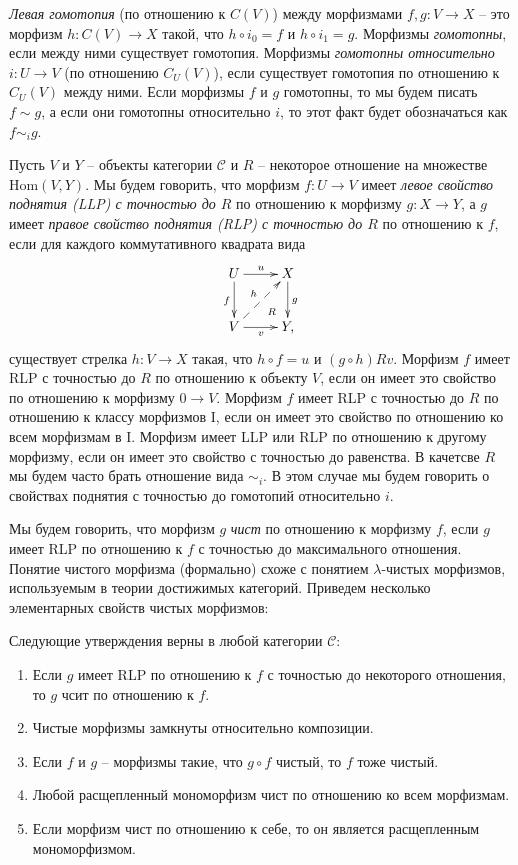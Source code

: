\documentclass[reqno]{amsart}
\theoremstyle{definition}
\theoremstyle{remark}
\newcommand{\cat}[1]{\mathcal{#1}}
\renewcommand{\C}{\cat{C}}
\newcommand{\fs}[1]{\mathrm{#1}}
\newcommand{\Hom}{\fs{Hom}}
\newcommand{\cyli}{i}
\newcommand{\I}{\mathrm{I}}
\begin{document}
\emph{Левая гомотопия} (по отношению к $C(V)$) между морфизмами $f,g : V \to X$ -- это морфизм $h : C(V) \to X$ такой, что $h \circ \cyli_0 = f$ и $h \circ \cyli_1 = g$.
Морфизмы \emph{гомотопны}, если между ними существует гомотопия.
Морфизмы \emph{гомотопны относительно $i : U \to V$} (по отношению $C_U(V)$), если существует гомотопия по отношению к $C_U(V)$ между ними.
Если морфизмы $f$ и $g$ гомотопны, то мы будем писать $f \sim g$, а если они гомотопны относительно $i$, то этот факт будет обозначаться как $f \sim_i g$.

Пусть $V$ и $Y$ -- объекты категории $\C$ и $R$ -- некоторое отношение на множестве $\Hom(V,Y)$.
Мы будем говорить, что морфизм $f : U \to V$ имеет \emph{левое свойство поднятия (LLP) с точностью до $R$} по отношению к морфизму $g : X \to Y$,
а $g$ имеет \emph{правое свойство поднятия (RLP) с точностью до $R$} по отношению к $f$, если для каждого коммутативного квадрата вида
\[ \xymatrix{ U \ar[r]^u \ar@{}[dr]|(.7){R} \ar[d]_f & X \ar[d]^g \\
              V \ar[r]_v \ar@{-->}[ur]^h             & Y,
            } \]
существует стрелка $h : V \to X$ такая, что $h \circ f = u$ и $(g \circ h) R v$.
Морфизм $f$ имеет RLP с точностью до $R$ по отношению к объекту $V$, если он имеет это свойство по отношению к морфизму $0 \to V$.
Морфизм $f$ имеет RLP с точностью до $R$ по отношению к классу морфизмов $\I$, если он имеет это свойство по отношению ко всем морфизмам в $\I$.
Морфизм имеет LLP или RLP по отношению к другому морфизму, если он имеет это свойство с точностью до равенства.
В качетсве $R$ мы будем часто брать отношение вида $\sim_i$.
В этом случае мы будем говорить о свойствах поднятия с точностью до гомотопий относительно $i$.

Мы будем говорить, что морфизм $g$ \emph{чист} по отношению к морфизму $f$, если $g$ имеет RLP по отношению к $f$ с точностью до максимального отношения.
Понятие чистого морфизма (формально) схоже с понятием $\lambda$-чистых морфизмов, используемым в теории достижимых категорий.
Приведем несколько элементарных свойств чистых морфизмов:

\begin{prop} Следующие утверждения верны в любой категории $\C$:
\begin{enumerate}
\item Если $g$ имеет RLP по отношению к $f$ с точностью до некоторого отношения, то $g$ чсит по отношению к $f$.
\item Чистые морфизмы замкнуты относительно композиции.
\item Если $f$ и $g$ -- морфизмы такие, что $g \circ f$ чистый, то $f$ тоже чистый.
\item Любой расщепленный мономорфизм чист по отношению ко всем морфизмам.
\item Если морфизм чист по отношению к себе, то он является расщепленным мономорфизмом.
\end{enumerate}
\end{prop}
\end{document}
